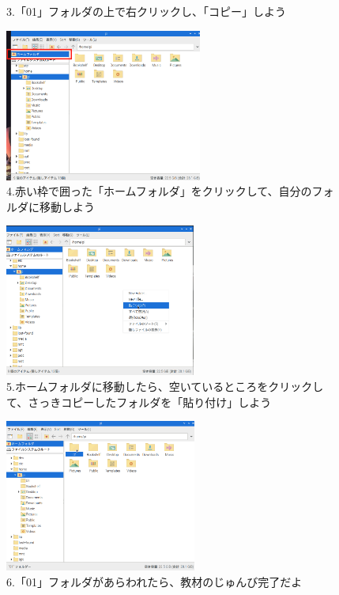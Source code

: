 \documentclass[a4paper,12pt]{jarticle}
\begin{document}
\begin{figure}
\begin{minipage}{\textwidth}
\begin{minipage}{0.45\linewidth}
      3.「01」フォルダの上で右クリックし、「コピー」しよう
    \end{minipage}
    \hfill
    \vspace{20pt}
    \begin{minipage}{0.45\linewidth}
      \includegraphics[width=\linewidth,height=5cm]{textbook-img1013.png}\\
      4.赤い枠で囲った「ホームフォルダ」をクリックして、自分のフォルダに移動しよう
    \end{minipage}    \begin{minipage}{0.45\linewidth}
      \includegraphics[width=\linewidth,height=5cm]{textbook-img1014.png}\\
      5.ホームフォルダに移動したら、空いているところをクリックして、さっきコピーしたフォルダを「貼り付け」しよう
    \end{minipage}
    \hfill
    \vspace{20pt}
    \begin{minipage}{0.45\linewidth}
      \includegraphics[width=\linewidth,height=5cm]{textbook-img1015.png}\\
      6.「01」フォルダがあらわれたら、教材のじゅんび完了だよ
    \end{minipage}

  \end{minipage}

  \bigskip

\end{figure}
\end{document}
